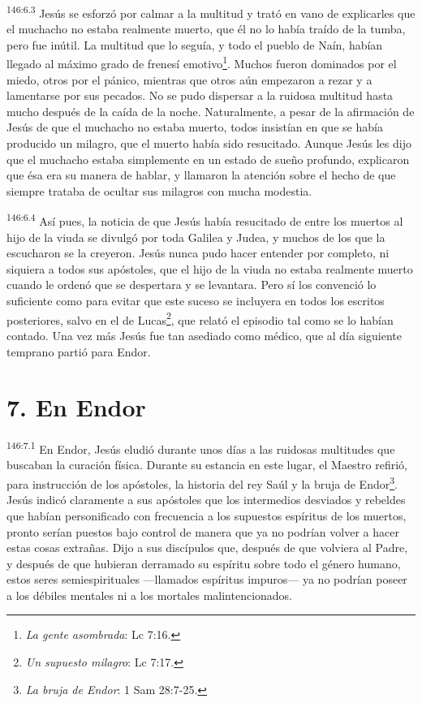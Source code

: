 \par
\textsuperscript{146:6.3} Jesús se esforzó por calmar a la multitud y trató en vano de explicarles que el muchacho no estaba realmente muerto, que él no lo había traído de la tumba, pero fue inútil. La multitud que lo seguía, y todo el pueblo de Naín, habían llegado al máximo grado de frenesí emotivo\footnote{\textit{La gente asombrada}: Lc 7:16.}. Muchos fueron dominados por el miedo, otros por el pánico, mientras que otros aún empezaron a rezar y a lamentarse por sus pecados. No se pudo dispersar a la ruidosa multitud hasta mucho después de la caída de la noche. Naturalmente, a pesar de la afirmación de Jesús de que el muchacho no estaba muerto, todos insistían en que se había producido un milagro, que el muerto había sido resucitado. Aunque Jesús les dijo que el muchacho estaba simplemente en un estado de sueño profundo, explicaron que ésa era su manera de hablar, y llamaron la atención sobre el hecho de que siempre trataba de ocultar sus milagros con mucha modestia.

\par
\textsuperscript{146:6.4} Así pues, la noticia de que Jesús había resucitado de entre los muertos al hijo de la viuda se divulgó por toda Galilea y Judea, y muchos de los que la escucharon se la creyeron. Jesús nunca pudo hacer entender por completo, ni siquiera a todos sus apóstoles, que el hijo de la viuda no estaba realmente muerto cuando le ordenó que se despertara y se levantara. Pero sí los convenció lo suficiente como para evitar que este suceso se incluyera en todos los escritos posteriores, salvo en el de Lucas\footnote{\textit{Un supuesto milagro}: Lc 7:17.}, que relató el episodio tal como se lo habían contado. Una vez más Jesús fue tan asediado como médico, que al día siguiente temprano partió para Endor.

\section*{7. En Endor}
\par
\textsuperscript{146:7.1} En Endor, Jesús eludió durante unos días a las ruidosas multitudes que buscaban la curación física. Durante su estancia en este lugar, el Maestro refirió, para instrucción de los apóstoles, la historia del rey Saúl y la bruja de Endor\footnote{\textit{La bruja de Endor}: 1 Sam 28:7-25.}. Jesús indicó claramente a sus apóstoles que los intermedios desviados y rebeldes que habían personificado con frecuencia a los supuestos espíritus de los muertos, pronto serían puestos bajo control de manera que ya no podrían volver a hacer estas cosas extrañas. Dijo a sus discípulos que, después de que volviera al Padre, y después de que hubieran derramado su espíritu sobre todo el género humano, estos seres semiespirituales ---llamados espíritus impuros--- ya no podrían poseer a los débiles mentales ni a los mortales malintencionados.

